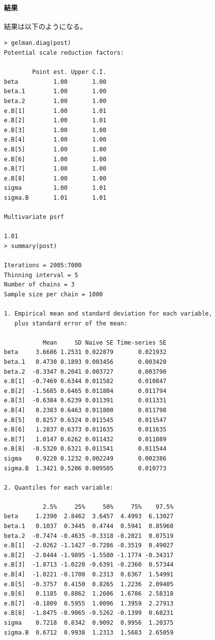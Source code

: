 \documentclass[11pt,uplatex]{jsarticle}
\begin{document}
\paragraph{結果}

結果は以下のようになる。
\vspace{1zw}
\begin{lstlisting}
> gelman.diag(post)
Potential scale reduction factors:

        Point est. Upper C.I.
beta          1.00       1.00
beta.1        1.00       1.00
beta.2        1.00       1.00
e.B[1]        1.00       1.01
e.B[2]        1.00       1.01
e.B[3]        1.00       1.00
e.B[4]        1.00       1.00
e.B[5]        1.00       1.00
e.B[6]        1.00       1.00
e.B[7]        1.00       1.00
e.B[8]        1.00       1.00
sigma         1.00       1.01
sigma.B       1.01       1.01

Multivariate psrf

1.01
> summary(post)

Iterations = 2005:7000
Thinning interval = 5 
Number of chains = 3 
Sample size per chain = 1000 

1. Empirical mean and standard deviation for each variable,
   plus standard error of the mean:

           Mean     SD Naive SE Time-series SE
beta     3.6686 1.2531 0.022879       0.021932
beta.1   0.4730 0.1893 0.003456       0.003420
beta.2  -0.3347 0.2041 0.003727       0.003790
e.B[1]  -0.7469 0.6344 0.011582       0.010847
e.B[2]  -1.5685 0.6465 0.011804       0.011794
e.B[3]  -0.6384 0.6239 0.011391       0.011331
e.B[4]   0.2383 0.6463 0.011800       0.011798
e.B[5]   0.8257 0.6324 0.011545       0.011547
e.B[6]   1.2837 0.6373 0.011635       0.011635
e.B[7]   1.0147 0.6262 0.011432       0.011089
e.B[8]  -0.5320 0.6321 0.011541       0.011544
sigma    0.9220 0.1232 0.002249       0.002386
sigma.B  1.3421 0.5206 0.009505       0.010773

2. Quantiles for each variable:

           2.5%     25%     50%     75%    97.5%
beta     1.2390  2.8462  3.6457  4.4993  6.13027
beta.1   0.1037  0.3445  0.4744  0.5941  0.85960
beta.2  -0.7474 -0.4635 -0.3318 -0.2021  0.07519
e.B[1]  -2.0262 -1.1427 -0.7286 -0.3519  0.49027
e.B[2]  -2.8444 -1.9895 -1.5580 -1.1774 -0.34317
e.B[3]  -1.8713 -1.0220 -0.6391 -0.2360  0.57344
e.B[4]  -1.0221 -0.1700  0.2313  0.6367  1.54991
e.B[5]  -0.3757  0.4150  0.8265  1.2236  2.09405
e.B[6]   0.1185  0.8862  1.2606  1.6786  2.58318
e.B[7]  -0.1809  0.5955  1.0096  1.3959  2.27913
e.B[8]  -1.8475 -0.9065 -0.5262 -0.1399  0.68231
sigma    0.7218  0.8342  0.9092  0.9956  1.20375
sigma.B  0.6712  0.9938  1.2313  1.5683  2.65059

\end{lstlisting}
\end{document}
